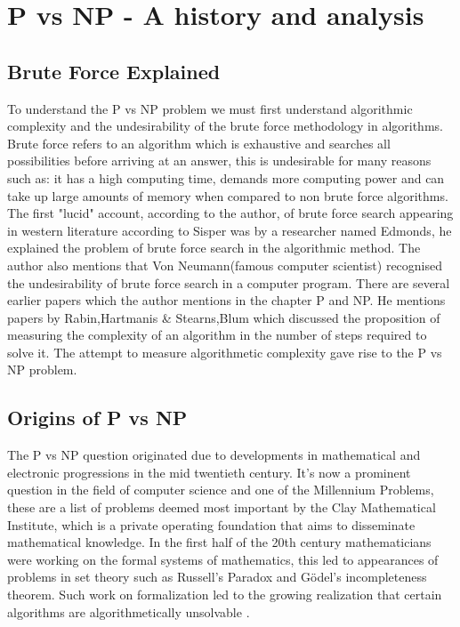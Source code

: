 \documentclass{report}
\begin{document}
\chapter{P vs NP - A history and analysis}
\section{Brute Force Explained}
To understand the P vs NP problem we must first understand algorithmic complexity and the undesirability of the brute force methodology in algorithms.
Brute force refers to an algorithm which is exhaustive and searches all possibilities before arriving at an answer, this is undesirable for many reasons such as: it has a high computing time, demands more computing power and can take up large amounts of memory when compared to non brute force algorithms. The first "lucid" account, according to the author, of brute force search appearing in western literature according to Sisper was by a researcher named Edmonds\cite{HistoryOfPVsNP}, he explained the problem of brute force search in the algorithmic method.  The author also mentions that Von Neumann(famous computer scientist\cite{Neumann}) recognised the undesirability of brute force search in a computer program. There are several earlier papers which the author mentions in the chapter P and NP. He mentions papers by Rabin\cite{ResearchPaperRabin},Hartmanis \& Stearns\cite{ResearchPaperHartmanis},Blum\cite{ResearchPaperBlum} which discussed the proposition of measuring the complexity of an algorithm in the number of steps required to solve it. The attempt to measure algorithmetic complexity gave rise to the P vs NP problem.
\section{Origins of P vs NP}
The P vs NP question originated due to developments in mathematical and electronic progressions in the mid twentieth century\cite{HistoryOfPVsNP}. It's now a prominent question in the field of computer science and one of the Millennium Problems\cite{Millennium}, these are a list of problems deemed most important by the Clay Mathematical Institute, which is a private operating foundation that aims to disseminate mathematical knowledge\cite{AboutMillennium}.  In the first half of the 20th century mathematicians were working on the formal systems of mathematics\cite{ResearchPaperFormalizeMathematics}, this led to appearances of problems in set theory such as Russell's Paradox\cite{RussellParadox} and Gödel's incompleteness theorem\cite{Godel}. Such work on formalization led to the growing realization that certain algorithms are algorithmetically unsolvable \cite{HistoryOfPVsNP}.
\end{document}

